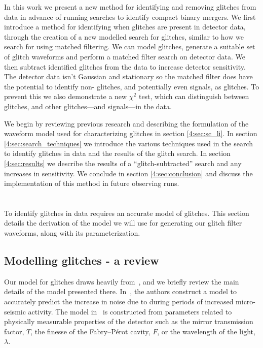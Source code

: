 In this work we present a new method for identifying and removing \scl{} glitches from \gw{} data in advance of running searches to identify compact binary mergers.
We first introduce a method for identifying when \scl{} glitches are present in detector data, through the creation of a new modelled search for \scl{} glitches, similar to how we search for \gws{} using matched filtering. We can model \scl{} glitches, generate a suitable set of glitch waveforms and perform a matched filter search on detector data. We then subtract identified glitches from the data to increase detector sensitivity. The detector data isn't Gaussian and stationary so the matched filter does have the potential to identify non-\scl{} glitches, and potentially even \gw{} signals, as \scl{} glitches. To prevent this we also demonstrate a new \scl{} $\chi^{2}$ test, which can distinguish between \scl{} glitches, and other glitches---and \gw{} signals---in the data.

We begin by reviewing previous research and describing the formulation of the waveform model used for characterizing \scl{} glitches in section \ref{4:sec:sc_li}. In section \ref{4:sec:search_techniques} we introduce the various techniques used in the search to identify \scl{} glitches in \gw{} data and the results of the \scl{} glitch search. In section \ref{4:sec:results} we describe the results of a ``glitch-subtracted'' \gw{} search and any increases in sensitivity. We conclude in section \ref{4:sec:conclusion} and discuss the implementation of this method in future observing runs.

\section{\label{4:sec:sc_li}\Scl{}}

To identify \scl{} glitches in \gw{} data requires an accurate model of \scl{} glitches. This section details the derivation of the model we will use for generating our \scl{} glitch filter waveforms, along with its parameterization.

\subsection{Modelling \scl{} glitches - a review}

Our model for \scl{} glitches draws heavily from~\cite{TAccadia:2010}, and we briefly review the main details of the model presented there. In~\cite{TAccadia:2010}, the authors construct a model to accurately predict the increase in noise due to \scl{} during periods of increased micro-seismic activity. The model in~\cite{TAccadia:2010} is constructed from parameters related to physically measurable properties of the detector such as the mirror transmission factor, $T$, the finesse of the Fabry–Pérot cavity, $F$, or the wavelength of the light, $\lambda$.

